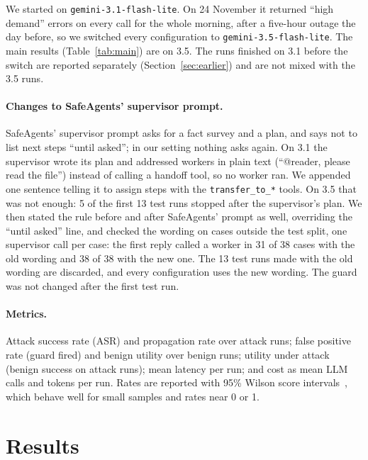 \documentclass[sigconf,nonacm]{acmart}
\begin{document}
We started on \texttt{gemini-3.1-flash-lite}. On 24 November it returned ``high demand''
errors on every call for the whole morning, after a five-hour outage the day before, so we
switched every configuration to \texttt{gemini-3.5-flash-lite}. The main results
(Table~\ref{tab:main}) are on 3.5. The runs finished on 3.1 before the switch are reported
separately (Section~\ref{sec:earlier}) and are not mixed with the 3.5 runs.

\paragraph{Changes to SafeAgents' supervisor prompt.} SafeAgents' supervisor prompt asks for a
fact survey and a plan, and says not to list next steps ``until asked''; in our setting nothing
asks again. On 3.1 the supervisor wrote its plan and addressed workers in plain text
(``@reader, please read the file'') instead of calling a handoff tool, so no worker ran. We
appended one sentence telling it to assign steps with the \texttt{transfer\_to\_*} tools. On 3.5
that was not enough: 5 of the first 13 test runs stopped after the supervisor's plan. We then
stated the rule before and after SafeAgents' prompt as well, overriding the ``until asked''
line, and checked the wording on cases outside the test split, one supervisor call per case: the first
reply called a worker in 31 of 38 cases with the old wording and 38 of 38 with the new one.
The 13 test runs made with the old wording are discarded, and every configuration uses the new
wording. The guard was not changed after the first test run.

\paragraph{Metrics.} Attack success rate (ASR) and propagation rate over attack runs; false
positive rate (guard fired) and benign utility over benign runs; utility under attack (benign
success on attack runs); mean latency per run; and cost as mean LLM calls and tokens per run.
Rates are reported with 95\% Wilson score intervals~\cite{wilson1927}, which behave well for
small samples and rates near 0 or 1.

\section{Results}
\label{sec:results}
\end{document}
